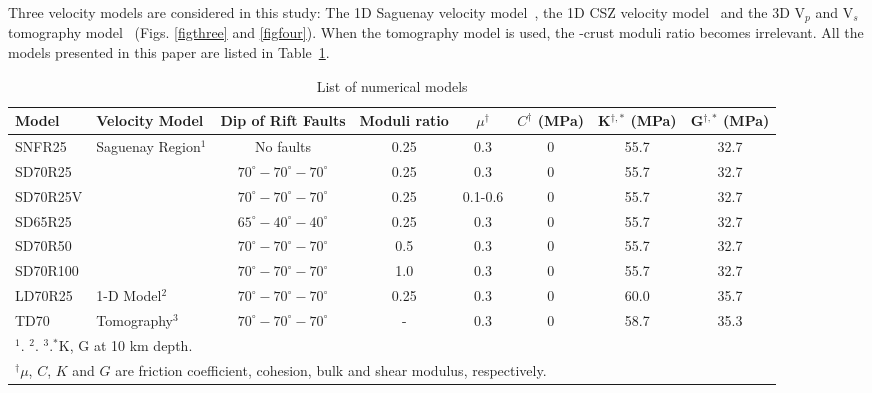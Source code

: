 \documentclass[draft]{agujournal2018}
\begin{document}
Three velocity models are considered in this study: The 1D Saguenay velocity model~\citep{Somerville1990}, the 1D CSZ velocity model~\citep{lamontagne1999} and the 3D V$_p$ and V$_s$ tomography model~\citep{Powell_2017} (Figs. \ref{figthree} and \ref{figfour}). When the tomography model is used, the -crust moduli ratio becomes irrelevant. All the models presented in this paper are listed in Table~\ref{tableone}.


\begin{table}
\caption{List of numerical models} 
\centering
\begin{tabular}{llcccccc}
\hline
Model & Velocity Model & Dip of Rift Faults & Moduli ratio & $\mu^{\dagger}$ & $C^{\dagger}$ (MPa) & K$^{\dagger,*}$ (MPa) & G$^{\dagger,*}$ (MPa) \\
\hline
SNFR25  & Saguenay Region$^{1}$ & No faults & 0.25 & 0.3 & 0 & 55.7 & 32.7  \\
SD70R25  &  & $70^\circ-70^\circ-70^\circ$  & 0.25 & 0.3 & 0 & 55.7 & 32.7 \\
SD70R25V  &  & $70^\circ-70^\circ-70^\circ$  & 0.25 & 0.1-0.6 & 0 & 55.7 & 32.7 \\
SD65R25  &  & $65^\circ-40^\circ-40^\circ$  & 0.25 & 0.3 & 0 & 55.7 & 32.7\\
SD70R50  &  & $70^\circ-70^\circ-70^\circ$  & 0.5 & 0.3 & 0 & 55.7 & 32.7 \\
SD70R100   &  & $70^\circ-70^\circ-70^\circ$  & 1.0 & 0.3 & 0 & 55.7 & 32.7 \\
LD70R25 & 1-D Model$^{2}$ & $70^\circ-70^\circ-70^\circ$ & 0.25 & 0.3  & 0 & 60.0 & 35.7 \\
TD70 & Tomography$^{3}$ & $70^\circ-70^\circ-70^\circ$ & - & 0.3 & 0 & 58.7 & 35.3 \\
\hline
\multicolumn{8}{l}{$^{1}$\citet{Somerville1990}. $^{2}$\citet{lamontagne1999}. $^{3}$\citet{Powell_2017}.$^{*}$K, G at 10 km depth.} \\
\multicolumn{8}{l}{$^{\dagger}$$\mu$, $C$, $K$ and $G$ are friction coefficient, cohesion, bulk and shear modulus, respectively.}

\end{tabular}
\label{tableone}
\end{table}


\end{document}
